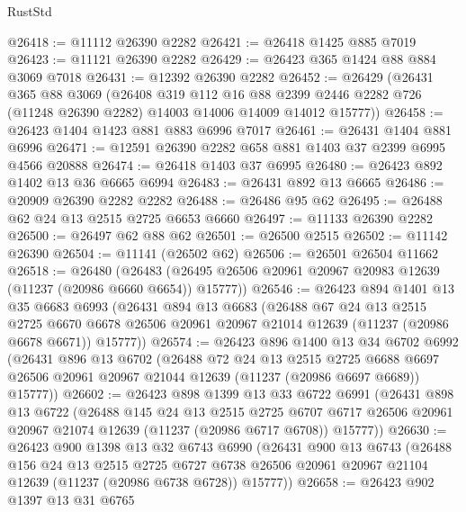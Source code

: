\begin{lexlean}{RustStd}
\begin{coremodule}
@26418 := @11112 @26390 @2282
@26421 := @26418 @1425 @885 @7019
@26423 := @11121 @26390 @2282
@26429 := @26423 @365 @1424 @88 @884 @3069 @7018
@26431 := @12392 @26390 @2282
@26452 := @26429
    (@26431
      @365
      @88
      @3069
      (@26408
        @319
        @112
        @16
        @88
        @2399
        @2446
        @2282
        @726
        (@11248 @26390 @2282)
        @14003
        @14006
        @14009
        @14012
        @15777))
@26458 := @26423 @1404 @1423 @881 @883 @6996 @7017
@26461 := @26431 @1404 @881 @6996
@26471 := @12591 @26390 @2282 @658 @881 @1403 @37 @2399 @6995 @4566 @20888
@26474 := @26418 @1403 @37 @6995
@26480 := @26423 @892 @1402 @13 @36 @6665 @6994
@26483 := @26431 @892 @13 @6665
@26486 := @20909 @26390 @2282 @2282
@26488 := @26486 @95 @62
@26495 := @26488 @62 @24 @13 @2515 @2725 @6653 @6660
@26497 := @11133 @26390 @2282
@26500 := @26497 @62 @88 @62
@26501 := @26500 @2515
@26502 := @11142 @26390
@26504 := @11141 (@26502 @62)
@26506 := @26501 @26504 @11662
@26518 := @26480
    (@26483 (@26495 @26506 @20961 @20967 @20983 @12639 (@11237 (@20986 @6660 @6654)) @15777))
@26546 := @26423
    @894
    @1401
    @13
    @35
    @6683
    @6993
    (@26431
      @894
      @13
      @6683
      (@26488
        @67
        @24
        @13
        @2515
        @2725
        @6670
        @6678
        @26506
        @20961
        @20967
        @21014
        @12639
        (@11237 (@20986 @6678 @6671))
        @15777))
@26574 := @26423
    @896
    @1400
    @13
    @34
    @6702
    @6992
    (@26431
      @896
      @13
      @6702
      (@26488
        @72
        @24
        @13
        @2515
        @2725
        @6688
        @6697
        @26506
        @20961
        @20967
        @21044
        @12639
        (@11237 (@20986 @6697 @6689))
        @15777))
@26602 := @26423
    @898
    @1399
    @13
    @33
    @6722
    @6991
    (@26431
      @898
      @13
      @6722
      (@26488
        @145
        @24
        @13
        @2515
        @2725
        @6707
        @6717
        @26506
        @20961
        @20967
        @21074
        @12639
        (@11237 (@20986 @6717 @6708))
        @15777))
@26630 := @26423
    @900
    @1398
    @13
    @32
    @6743
    @6990
    (@26431
      @900
      @13
      @6743
      (@26488
        @156
        @24
        @13
        @2515
        @2725
        @6727
        @6738
        @26506
        @20961
        @20967
        @21104
        @12639
        (@11237 (@20986 @6738 @6728))
        @15777))
@26658 := @26423
    @902
    @1397
    @13
    @31
    @6765

\end{coremodule}
\end{lexlean}
